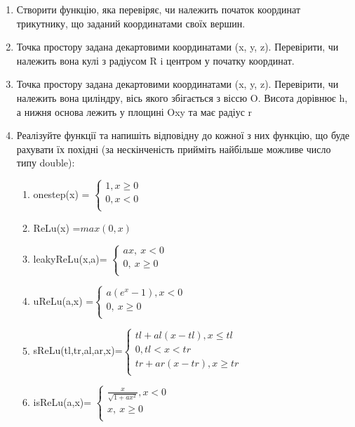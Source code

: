 \documentclass[]{article}
\makeatletter
\newcommand{\xslalph}[1]{\expandafter\@xslalph\csname c@#1\endcsname}
\newcommand{\@xslalph}[1]{%
    \ifcase#1\or а\or б\or в\or г\or д\or e\or є\or ж\or з\or i%
    \or й\or к\or л\or м\or н\or о\or п\or р\or с\or т%
    \or у\or ф\or х\or ц\or ч\or ш\or ю\or я\or аа\or бб\or вв%
    \else\@ctrerr\fi%
}
\makeatother
\begin{document}
\begin{enumerate}
\item
  Створити функцію, яка перевіряє, чи належить початок координат
  трикутнику, що заданий координатами своїх вершин.
\item
  Точка простору задана декартовими координатами (x, y, z). Перевірити,
  чи належить вона кулі з радіусом R i центром у початку координат.
\item
  Точка простору задана декартовими координатами (x, y, z). Перевірити,
  чи належить вона циліндру, вісь якого збігається з віссю O. Висота
  дорівнює h, а нижня основа лежить у площині Oxy та має радіус r
\item
  Реалізуйте функції та напишіть відповідну до кожної з них функцію, що
  буде рахувати їх похідні (за нескінченість прийміть найбільше можливе 
число типу double):
\begin{enumerate}[label=\xslalph*)]
\item onestep(x) = \(\left\{ \begin{matrix}
1,x \geq 0 \\
0,x < 0 \\
\end{matrix} \right.\ \)

\item 
ReLu(x) =\(max(0,x)\)

\item
leakyReLu(x,a)= \(\left\{ \begin{matrix}
ax,\ x < 0 \\
0,\ x \geq 0 \\
\end{matrix} \right.\ \)

\item 
uReLu(a,x) =\(\left\{ \begin{matrix}
a(e^{x} - 1),x < 0 \\
0,\ x \geq 0 \\
\end{matrix} \right.\ \)

\item 
sReLu(tl,tr,al,ar,x)=\(\left\{ \begin{matrix}
tl + al\left( x - tl \right),x \leq tl \\
0,tl < x < tr \\
tr + ar\left( x - tr \right),x \geq tr \\
\end{matrix} \right.\ \)

\item
 isReLu(a,x)= \(\left\{ \begin{matrix}
\frac{x}{\sqrt{1 + ax^{2}}},x < 0 \\
x,\ x \geq 0 \\
\end{matrix} \right.\ \)


\end{enumerate}
\end{enumerate}
\end{document}

